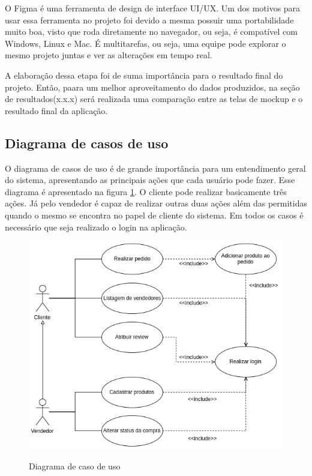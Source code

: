 O Figma é uma ferramenta de design de interface UI/UX. Um dos motivos para usar essa ferramenta no projeto foi devido a mesma possuir uma portabilidade muito boa, visto que roda diretamente no navegador, ou seja, é compatível com Windows, Linux e Mac. É multitarefas, ou seja, uma equipe pode explorar o mesmo projeto juntas e ver as alterações em tempo real.

A elaboração dessa etapa foi de suma importância para o resultado final do projeto. Então, paara um melhor aproveitamento do dados produzidos, na seção de resultados(x.x.x) será realizada uma comparação entre as telas de mockup e o resultado final da aplicação.

\subsection{Diagrama de casos de uso}
O diagrama de casos de uso é de grande importância para um entendimento geral do sistema, apresentando as principais ações que cada usuário pode fazer. Esse diagrama é apresentado na figura \ref{fig:use}. O cliente pode realizar basicamente três ações. Já pelo vendedor é capaz de realizar outras duas ações além das permitidas quando o mesmo se encontra no papel de cliente do sistema. Em todos os casos é necessário que seja realizado o login na aplicação.
\begin{figure}[htbp!]
  \centering
  \caption{Diagrama de caso de uso}
  \includegraphics[width=1\textwidth]{figs/caso_de_uso.png}
    \label{fig:use}
\end{figure}



